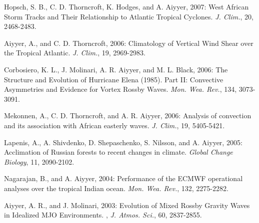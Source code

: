 \begin{ilist}
\item Hopsch, S. B., C. D. Thorncroft, K. Hodges, and A. Aiyyer, 2007: West African Storm Tracks and Their Relationship to Atlantic Tropical Cyclones. \emph{J. Clim.}, 20, 2468-2483.

\item Aiyyer, A., and C. D. Thorncroft, 2006: Climatology of Vertical Wind Shear over the Tropical Atlantic. \emph{J. Clim.}, 19, 2969-2983.

\item Corbosiero, K. L., J. Molinari, A. R. Aiyyer, and M. L. Black, 2006: The Structure and Evolution of Hurricane Elena (1985). Part II: Convective Asymmetries and Evidence for Vortex Rossby Waves. \emph{Mon. Wea. Rev.}, 134, 3073-3091. 

\item Mekonnen, A., C. D. Thorncroft, and A. R. Aiyyer, 2006: Analysis of convection and its association with African easterly waves. \emph{J. Clim.}, 19, 5405-5421.

\item Lapenis, A., A. Shivdenko, D. Shepaschenko, S. Nilsson, and A. Aiyyer, 2005: Acclimation of Russian forests to recent changes in climate. \emph{ Global Change Biology}, 11, 2090-2102.

\item Nagarajan, B., and A. Aiyyer, 2004: Performance of the ECMWF operational analyses over the tropical Indian ocean. \emph{Mon. Wea. Rev.}, 132, 2275-2282. 

\item Aiyyer, A. R., and J. Molinari, 2003: Evolution of Mixed Rossby Gravity Waves in Idealized MJO Environments. , \emph{J. Atmos. Sci.}, 60, 2837-2855.

\end{ilist}
